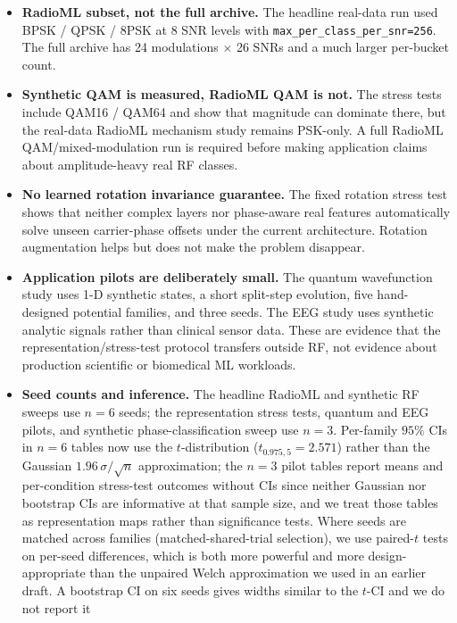 \documentclass{article}
\newcommand{\code}[1]{\texttt{#1}}
\begin{document}
\begin{itemize}
  \item \textbf{RadioML subset, not the full archive.} The headline
    real-data run used BPSK / QPSK / 8PSK at 8 SNR levels with
    \code{max\_per\_class\_per\_snr=256}. The full archive has 24
    modulations $\times$ 26 SNRs and a much larger per-bucket count.
  \item \textbf{Synthetic QAM is measured, RadioML QAM is not.} The
    stress tests include QAM16 / QAM64 and show that magnitude can
    dominate there, but the real-data RadioML mechanism study remains
    PSK-only. A full RadioML QAM/mixed-modulation run is required
    before making application claims about amplitude-heavy real RF
    classes.
  \item \textbf{No learned rotation invariance guarantee.} The fixed
    rotation stress test shows that neither complex layers nor
    phase-aware real features automatically solve unseen carrier-phase
    offsets under the current architecture. Rotation augmentation helps
    but does not make the problem disappear.
  \item \textbf{Application pilots are deliberately small.} The quantum
    wavefunction study uses 1-D synthetic states, a short split-step
    evolution, five hand-designed potential families, and three seeds.
    The EEG study uses synthetic analytic signals rather than clinical
    sensor data. These are evidence that the representation/stress-test
    protocol transfers outside RF, not evidence about production
    scientific or biomedical ML workloads.
  \item \textbf{Seed counts and inference.} The headline RadioML and
    synthetic RF sweeps use $n=6$ seeds; the representation stress
    tests, quantum and EEG pilots, and synthetic phase-classification
    sweep use $n=3$. Per-family $95\%$ CIs in $n=6$ tables now use
    the $t$-distribution ($t_{0.975, 5}=2.571$) rather than the
    Gaussian $1.96\,\sigma/\sqrt{n}$ approximation; the $n=3$ pilot
    tables report means and per-condition stress-test outcomes
    without CIs since neither Gaussian nor bootstrap CIs are
    informative at that sample size, and we treat those tables as
    representation maps rather than significance tests. Where seeds
    are matched across families (matched-shared-trial selection), we
    use paired-$t$ tests on per-seed differences, which is both more
    powerful and more design-appropriate than the unpaired Welch
    approximation we used in an earlier draft. A bootstrap CI on six
    seeds gives widths similar to the $t$-CI and we do not report it

\end{itemize}
\end{document}
